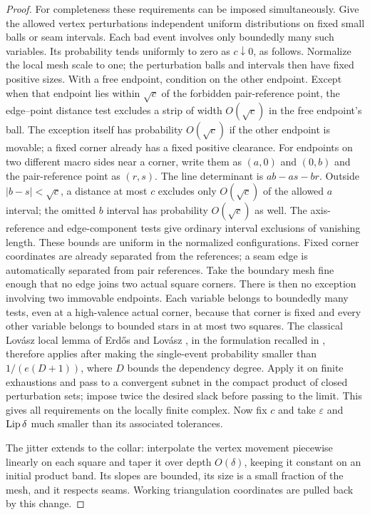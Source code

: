 \begin{proof}
For completeness these requirements can be imposed simultaneously.
Give the allowed vertex perturbations independent uniform
distributions on fixed small balls or seam intervals.  Each bad event
involves only boundedly many such variables.  Its probability tends
uniformly to zero as $c\downarrow0$, as follows.  Normalize the local
mesh scale to one; the perturbation balls and intervals then have
fixed positive sizes.  With a free endpoint, condition on the other
endpoint.  Except when that endpoint lies within $\sqrt c$ of the
forbidden pair-reference point, the edge--point distance test excludes
a strip of width $O(\sqrt c)$ in the free endpoint's ball.  The
exception itself has probability $O(\sqrt c)$ if the other endpoint
is movable; a fixed corner already has a fixed positive clearance.
For endpoints on two different macro sides near a corner, write them
as $(a,0)$ and $(0,b)$ and the pair-reference point as $(r,s)$.
The line determinant is $ab-as-br$.  Outside
$|b-s|<\sqrt c$, a distance at most $c$ excludes only
$O(\sqrt c)$ of the allowed $a$ interval; the omitted $b$ interval
has probability $O(\sqrt c)$ as well.  The axis-reference and
edge-component tests give ordinary interval exclusions of vanishing
length.  These bounds are uniform in the normalized configurations.
Fixed corner
coordinates are already separated from the references; a seam edge
is automatically separated from pair references.  Take the boundary
mesh fine enough that no edge joins two actual square corners.
There is then no exception involving two immovable endpoints.
Each variable belongs
to boundedly many tests, even at a high-valence actual corner,
because that corner is fixed and every other variable belongs to
bounded stars in at most two squares.  The classical Lov\'asz local lemma of Erd\H{o}s and Lov\'asz
\cite{ErdosLovasz1975}, in the formulation recalled in
\cite[Theorem~1.1]{MoserTardos2010},
therefore applies after making the single-event probability smaller
than $1/(e(D+1))$, where $D$ bounds the dependency degree.  Apply it on
finite exhaustions and pass to a convergent subnet in the compact
product of closed perturbation sets; impose twice the desired slack
before passing to the limit.  This gives all requirements on the
locally finite complex.  Now fix $c$ and take $\varepsilon$ and
$\operatorname{Lip}\delta$ much smaller than its associated tolerances.

The jitter extends to the collar: interpolate the vertex movement
piecewise linearly on each square and taper it over depth
$O(\delta)$, keeping it constant on an initial product band.
Its slopes are bounded, its size is a small fraction of the mesh,
and it respects seams.  Working triangulation coordinates are pulled
back by this change.


\end{proof}
